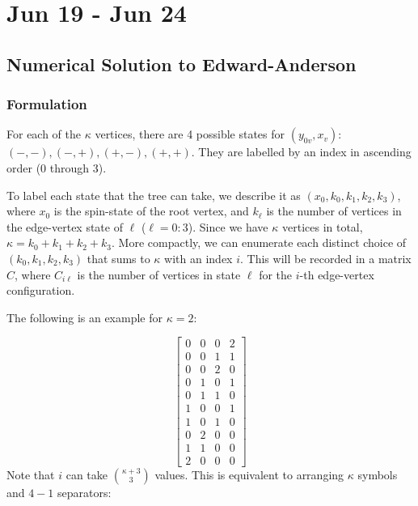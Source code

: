 \documentclass[12pt]{article}
\numberwithin{equation}{section}
\begin{document}
\newpage

\section{Jun 19 - Jun 24}

\subsection{Numerical Solution to Edward-Anderson}

\subsubsection{Formulation}

For each of the $\kappa$ vertices, there are 4 possible states for $(y_{0v}, x_v)$: $(-, -), (-, +), (+, -), (+, +)$.
They are labelled by an index in ascending order (0 through 3).

To label each state that the tree can take, we describe it as $(x_0, k_0, k_1, k_2, k_3)$, where $x_0$ is the spin-state of the root vertex,
and $k_\ell$ is the number of vertices in the edge-vertex state of $\ell$ ($\ell=0:3$). Since we have $\kappa$ vertices in total, $\kappa=k_0+k_1+k_2+k_3$.
More compactly, we can enumerate each distinct choice of $(k_0, k_1, k_2, k_3)$ that sums to $\kappa$ with an index $i$. This will be recorded in
a matrix $C$, where $C_{i\ell}$ is the number of vertices in state $\ell$ for the $i$-th edge-vertex configuration.

The following is an example for $\kappa=2$:

\begin{equation*}
    \begin{bmatrix}
        0 & 0 & 0 & 2 \\
        0 & 0 & 1 & 1 \\
        0 & 0 & 2 & 0 \\
        0 & 1 & 0 & 1 \\
        0 & 1 & 1 & 0 \\
        1 & 0 & 0 & 1 \\
        1 & 0 & 1 & 0 \\
        0 & 2 & 0 & 0 \\
        1 & 1 & 0 & 0 \\
        2 & 0 & 0 & 0
    \end{bmatrix}
\end{equation*}
Note that $i$ can take ${\kappa+3 \choose 3}$ values. This is equivalent to arranging $\kappa$ symbols and $4-1$ separators:
\end{document}
